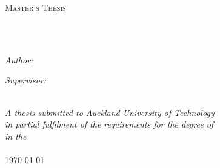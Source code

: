 \documentclass[
12pt, %
oneside, %
english, %
onehalfspacing,
headsepline, %
]{MastersDoctoralThesis} %
\begin{document}
\begin{titlepage}
\begin{center}

{\scshape\LARGE \univname\par}\vspace{1.5cm} %
\textsc{\Large Master's Thesis}\\[0.5cm] %

\HRule \\[0.4cm] %
{\huge \bfseries \ttitle\par}\vspace{0.4cm} %
\HRule \\[1.5cm] %
 
\begin{minipage}[t]{0.4\textwidth}
\begin{flushleft} \large
\emph{Author:}\\
\href{http://www.johnsmith.com}{\authorname} %
\end{flushleft}
\end{minipage}
\begin{minipage}[t]{0.4\textwidth}
\begin{flushright} \large
\emph{Supervisor:} \\
\href{http://www.jamessmith.com}{\supname} %
\end{flushright}
\end{minipage}\\[3cm]
 
\large \textit{A thesis submitted to Auckland University of Technology\\ in partial fulfilment of the requirements for the degree of \degreename}\\[0.3cm] %
\textit{in the}\\[0.4cm]
\deptname\\[2cm] %
 
{\large \today}\\[4cm] %
 
\vfill
\end{center}
\end{titlepage}
\end{document}
